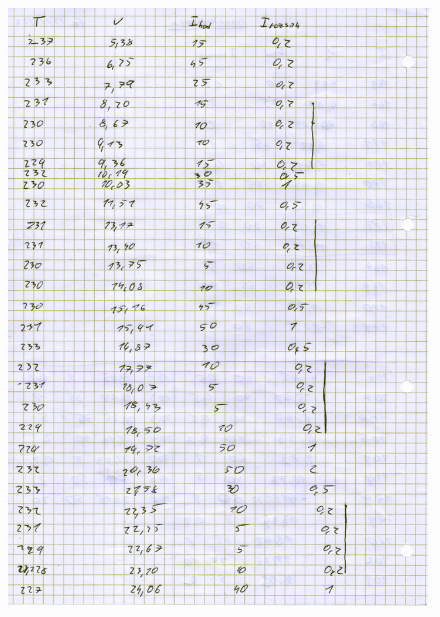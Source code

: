 \documentclass[titlepage]{article}
\begin{document}
\begin{figure}[H]
\begin{minipage}{0.4\textwidth}
  \includegraphics[width=\textwidth]{scan/page2.png}
 \end{minipage}
 \begin{minipage}{0.4\textwidth}

\end{minipage}
\end{figure}
\end{document}
